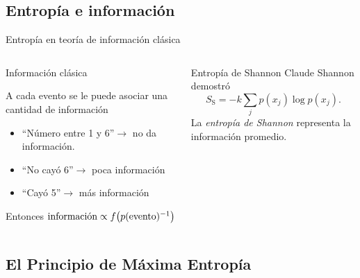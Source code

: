 \subsection{Entropía e información}

\begin{frame}{Entropía en teoría de información clásica}
    \begin{columns}
        \begin{column}{0.5\textwidth}
            \begin{block}{Información clásica}
            \begin{center}
                A cada evento se le puede asociar una cantidad de información\pause
            \end{center}
            \begin{itemize}
                \item ``Número entre 1 y 6''$\rightarrow$ no da información. \pause
                \item ``No cayó 6''$\rightarrow$ poca información\pause
                \item ``Cayó 5''$\rightarrow$ más información\pause
            \end{itemize}
            Entonces $\text{información}\propto f\qty(p(\text{evento})^{-1})$
        \end{block}
        \end{column}
        \pause
        \begin{column}{0.5\textwidth}
            \begin{block}{Entropía de Shannon}
            Claude Shannon demostró
            \begin{equation}
                S_{\text{S}}=-k\sum_{j}p(x_{j})\log{p(x_{j})}.\nonumber
            \end{equation}\pause
            La \textit{entropía de Shannon} representa la información promedio.
        \end{block}
        \end{column}
    \end{columns}
\end{frame}

\subsection{El Principio de Máxima Entropía}

